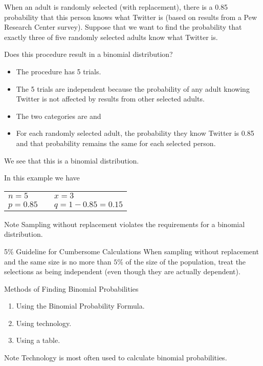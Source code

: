 \documentclass{beamer}
\begin{document}
\begin{frame}
\begin{example}
When an adult is randomly selected (with replacement), there is a 0.85 probability that this person knows what Twitter is (based on results from a Pew Research Center survey). Suppose that we want to find the probability that exactly three of five randomly selected adults know what Twitter is.\pause

\vspace{1mm}
Does this procedure result in a binomial distribution?\pause
\begin{itemize}
\item The procedure has 5 trials.\pause
\item The 5 trials are independent because the probability of any adult knowing Twitter is not affected by results from other selected adults.\pause
\item The two categories are  and \pause
\item For each randomly selected adult, the probability they know Twitter is 0.85 and that probability remains the same for each selected person.\pause
\end{itemize}
We see that this is a binomial distribution.\pause

\vspace{1mm}
In this example we have
\begin{center}
\begin{tabular}{lcl}
$n = 5$ &\quad& $x = 3$ \\
$p = 0.85$ &\quad& $q = 1-0.85=0.15$
\end{tabular}
\end{center}
\end{example}
\end{frame}

\begin{frame}
\begin{block}{Note}
Sampling without replacement violates the requirements for a binomial distribution.
\end{block}\pause

\begin{block}{5\% Guideline for Cumbersome Calculations}
When sampling without replacement and the same size is no more than $5\%$ of the size of the population, treat the selections as being independent (even though they are actually dependent).
\end{block}\pause

\begin{block}{Methods of Finding Binomial Probabilities}
\begin{enumerate}
\item Using the Binomial Probability Formula.
\item Using technology.
\item Using a table.
\end{enumerate}
\end{block}\pause

\begin{block}{Note}
Technology is most often used to calculate binomial probabilities.
\end{block}
\end{frame}
\end{document}
